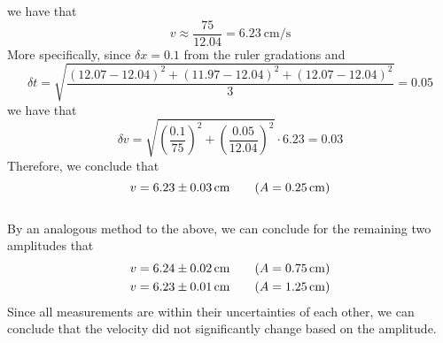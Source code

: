 \documentclass{article}
\begin{document}
we have that
\begin{equation*}
    v \approx \frac{75}{12.04} = \SI{6.23}{\centi\meter\per\second}
\end{equation*}
More specifically, since $\delta x=0.1$ from the ruler gradations and
\begin{equation*}
    \delta t = \sqrt{\frac{(12.07-12.04)^2+(11.97-12.04)^2+(12.07-12.04)^2}{3}} = 0.05
\end{equation*}
we have that
\begin{equation*}
    \delta v = \sqrt{\left( \frac{0.1}{75} \right)^2+\left( \frac{0.05}{12.04} \right)^2}\cdot 6.23 = 0.03
\end{equation*}
Therefore, we conclude that
\begin{equation*}
    v = 6.23\pm\SI{0.03}{\centi\meter}\tag{$A=\SI{0.25}{\centi\meter}$}
\end{equation*}\\
By an analogous method to the above, we can conclude for the remaining two amplitudes that
\begin{gather*}
    v = 6.24\pm\SI{0.02}{\centi\meter}\tag{$A=\SI{0.75}{\centi\meter}$}\\
    v = 6.23\pm\SI{0.01}{\centi\meter}\tag{$A=\SI{1.25}{\centi\meter}$}
\end{gather*}
Since all measurements are within their uncertainties of each other, we can conclude that the velocity did not significantly change based on the amplitude.
\end{document}
